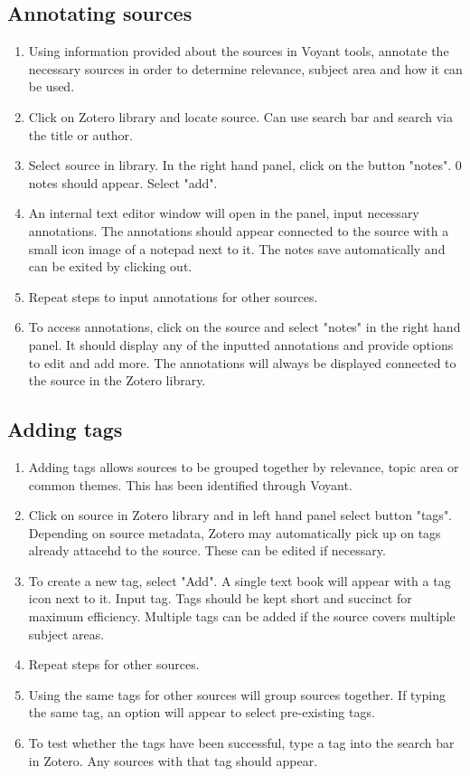\documentclass{article}
\begin{document}
\subsection{Annotating sources}
\begin{enumerate}
    \item Using information provided about the sources in Voyant tools, annotate the necessary sources in order to determine relevance, subject area and how it can be used.
    \item Click on Zotero library and locate source. Can use search bar and search via the title or author.
    \item Select source in library. In the right hand panel, click on the button "notes". 0 notes should appear. Select "add".
    \item An internal text editor window will open in the panel, input necessary annotations. The annotations should appear connected to the source with a small icon image of a notepad next to it. The notes save automatically and can be exited by clicking out.
    \item Repeat steps to input annotations for other sources.
    \item To access annotations, click on the source and select "notes" in the right hand panel. It should display any of the inputted annotations and provide options to edit and add more. The annotations will always be displayed connected to the source in the Zotero library.
\end{enumerate}

\subsection{Adding tags}
\begin{enumerate}
    \item Adding tags allows sources to be grouped together by relevance, topic area or common themes. This has been identified through Voyant.
    \item Click on source in Zotero library and in left hand panel select button "tags". Depending on source metadata, Zotero may automatically pick up on tags already attacehd to the source. These can be edited if necessary.
    \item To create a new tag, select "Add". A single text book will appear with a tag icon next to it. Input tag. Tags should be kept short and succinct for maximum efficiency. Multiple tags can be added if the source covers multiple subject areas.
    \item Repeat steps for other sources. 
    \item Using the same tags for other sources will group sources together. If typing the same tag, an option will appear to select pre-existing tags. 
    \item To test whether the tags have been successful, type a tag into the search bar in Zotero. Any sources with that tag should appear.
\end{enumerate}
\end{document}
